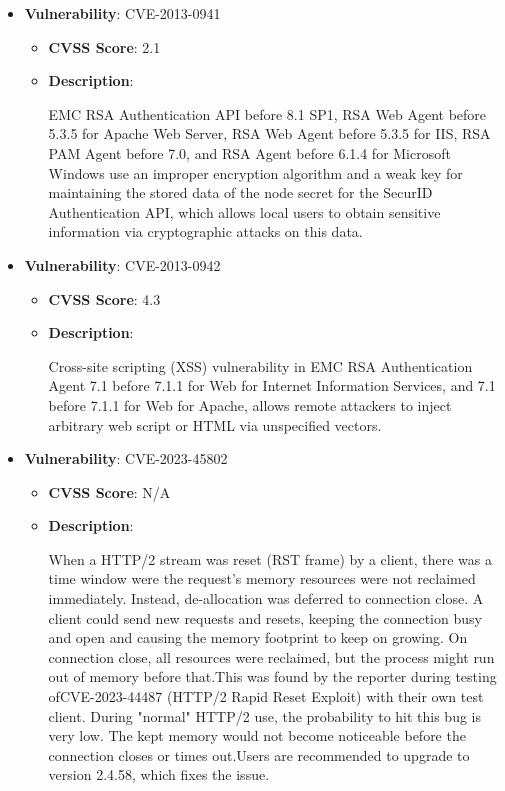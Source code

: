 \documentclass{article}
\begin{document}
\begin{itemize}
        \item \textbf{Vulnerability}: CVE-2013-0941
        \begin{itemize}
            \item \textbf{CVSS Score}:  2.1 
            \item \textbf{Description}:
            \parbox[t]{0.9\linewidth}{
                \ttfamily EMC RSA Authentication API before 8.1 SP1, RSA Web Agent before 5.3.5 for Apache Web Server, RSA Web Agent before 5.3.5 for IIS, RSA PAM Agent before 7.0, and RSA Agent before 6.1.4 for Microsoft Windows use an improper encryption algorithm and a weak key for maintaining the stored data of the node secret for the SecurID Authentication API, which allows local users to obtain sensitive information via cryptographic attacks on this data.
            }
        \end{itemize}
    
        \item \textbf{Vulnerability}: CVE-2013-0942
        \begin{itemize}
            \item \textbf{CVSS Score}:  4.3 
            \item \textbf{Description}:
            \parbox[t]{0.9\linewidth}{
                \ttfamily Cross-site scripting (XSS) vulnerability in EMC RSA Authentication Agent 7.1 before 7.1.1 for Web for Internet Information Services, and 7.1 before 7.1.1 for Web for Apache, allows remote attackers to inject arbitrary web script or HTML via unspecified vectors.
            }
        \end{itemize}
    
        \item \textbf{Vulnerability}: CVE-2023-45802
        \begin{itemize}
            \item \textbf{CVSS Score}:  N/A 
            \item \textbf{Description}:
            \parbox[t]{0.9\linewidth}{
                \ttfamily When a HTTP/2 stream was reset (RST frame) by a client, there was a time window were the request's memory resources were not reclaimed immediately. Instead, de-allocation was deferred to connection close. A client could send new requests and resets, keeping the connection busy and open and causing the memory footprint to keep on growing. On connection close, all resources were reclaimed, but the process might run out of memory before that.This was found by the reporter during testing ofCVE-2023-44487 (HTTP/2 Rapid Reset Exploit) with their own test client. During "normal" HTTP/2 use, the probability to hit this bug is very low. The kept memory would not become noticeable before the connection closes or times out.Users are recommended to upgrade to version 2.4.58, which fixes the issue.
            }
        \end{itemize}
    

\end{itemize}
\end{document}
